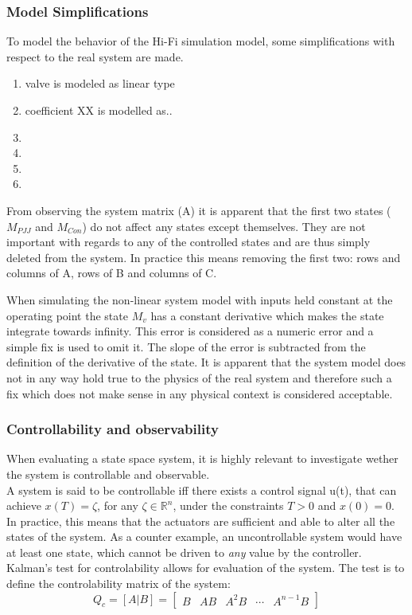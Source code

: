 \subsubsection{Model Simplifications}
To model the behavior of the Hi-Fi simulation model, some simplifications with respect to the real system are made.

\begin{enumerate}
	\item valve is modeled as linear type
	\item coefficient XX is modelled as..
	\item
	\item
	\item
	\item
\end{enumerate}

From observing the system matrix (A) it is apparent that the first two states ($M_{PJJ}$ and $M_{Con}$) do not affect any states except themselves. They are not important with regards to any of the controlled states and are thus simply deleted from the system. In practice this means removing the first two: rows and columns of A, rows of B and columns of C.

When simulating the non-linear system model with inputs held constant at the operating point the state $M_v$ has a constant derivative which makes the state integrate towards infinity. This error is considered as a numeric error  and a simple fix is used to omit it. The slope of the error is subtracted from the definition of the derivative of the state. It is apparent that the system model does not in any way hold true to the physics of the real system and therefore such a fix which does not make sense in any physical context is considered acceptable.





\subsubsection{Controllability and observability}
When evaluating a state space system, it is highly relevant to investigate wether the system is controllable and observable. \\
A system is said to be controllable iff there exists a control signal u(t), that can achieve $x(T) = \zeta$, for any $\zeta \in \mathbb{R} ^{n}$, under the constraints $T>0$ and $x(0)=0$. In practice, this means that the actuators are sufficient and able to alter all the states of the system. As a counter example, an uncontrollable system would have at least one state, which cannot be driven to \textit{any} value by the controller.\\
Kalman's test for controlability allows for evaluation of the system. The test is to define the controlability matrix of the system:
\begin{equation} 
	Q_c = [A|B] = \begin{bmatrix}
		B & AB & A^2B & \cdots & A^{n-1}B
	\end{bmatrix}
\end{equation}

